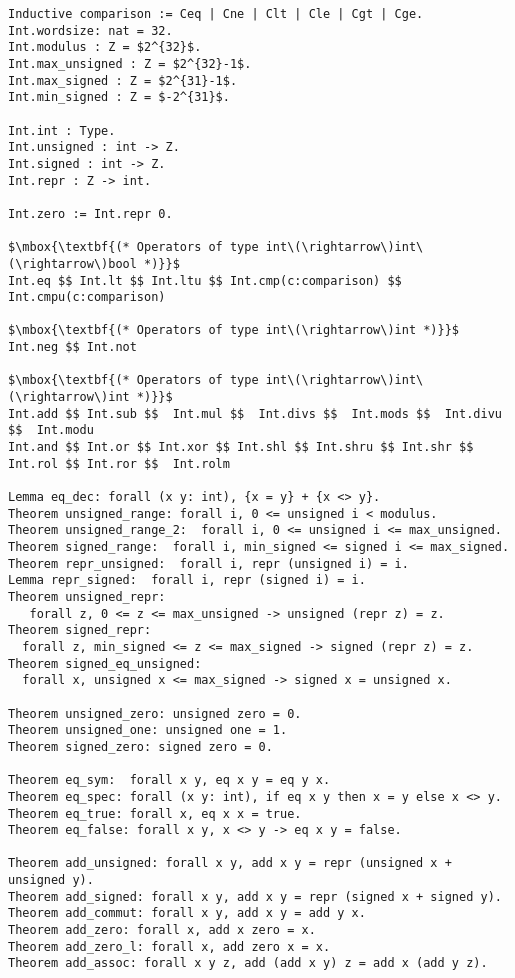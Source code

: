 \documentclass[12pt,fleqn,openany,oneside,showtrims]{memoir}
\begin{document}
\begin{lstlisting}
Inductive comparison := Ceq | Cne | Clt | Cle | Cgt | Cge.
Int.wordsize: nat = 32.
Int.modulus : Z = $2^{32}$.
Int.max_unsigned : Z = $2^{32}-1$.
Int.max_signed : Z = $2^{31}-1$.
Int.min_signed : Z = $-2^{31}$.

Int.int : Type.
Int.unsigned : int -> Z.
Int.signed : int -> Z.
Int.repr : Z -> int.

Int.zero := Int.repr 0.

$\mbox{\textbf{(* Operators of type int\(\rightarrow\)int\(\rightarrow\)bool *)}}$
Int.eq $$ Int.lt $$ Int.ltu $$ Int.cmp(c:comparison) $$ Int.cmpu(c:comparison)

$\mbox{\textbf{(* Operators of type int\(\rightarrow\)int *)}}$
Int.neg $$ Int.not

$\mbox{\textbf{(* Operators of type int\(\rightarrow\)int\(\rightarrow\)int *)}}$
Int.add $$ Int.sub $$  Int.mul $$  Int.divs $$  Int.mods $$  Int.divu $$  Int.modu
Int.and $$ Int.or $$ Int.xor $$ Int.shl $$ Int.shru $$ Int.shr $$ Int.rol $$ Int.ror $$  Int.rolm

Lemma eq_dec: forall (x y: int), {x = y} + {x <> y}.
Theorem unsigned_range: forall i, 0 <= unsigned i < modulus.
Theorem unsigned_range_2:  forall i, 0 <= unsigned i <= max_unsigned.
Theorem signed_range:  forall i, min_signed <= signed i <= max_signed.
Theorem repr_unsigned:  forall i, repr (unsigned i) = i.
Lemma repr_signed:  forall i, repr (signed i) = i.
Theorem unsigned_repr:
   forall z, 0 <= z <= max_unsigned -> unsigned (repr z) = z.
Theorem signed_repr:
  forall z, min_signed <= z <= max_signed -> signed (repr z) = z.
Theorem signed_eq_unsigned:
  forall x, unsigned x <= max_signed -> signed x = unsigned x.

Theorem unsigned_zero: unsigned zero = 0.
Theorem unsigned_one: unsigned one = 1.
Theorem signed_zero: signed zero = 0.

Theorem eq_sym:  forall x y, eq x y = eq y x.
Theorem eq_spec: forall (x y: int), if eq x y then x = y else x <> y.
Theorem eq_true: forall x, eq x x = true.
Theorem eq_false: forall x y, x <> y -> eq x y = false.

Theorem add_unsigned: forall x y, add x y = repr (unsigned x + unsigned y).
Theorem add_signed: forall x y, add x y = repr (signed x + signed y).
Theorem add_commut: forall x y, add x y = add y x.
Theorem add_zero: forall x, add x zero = x.
Theorem add_zero_l: forall x, add zero x = x.
Theorem add_assoc: forall x y z, add (add x y) z = add x (add y z).


\end{lstlisting}
\end{document}
